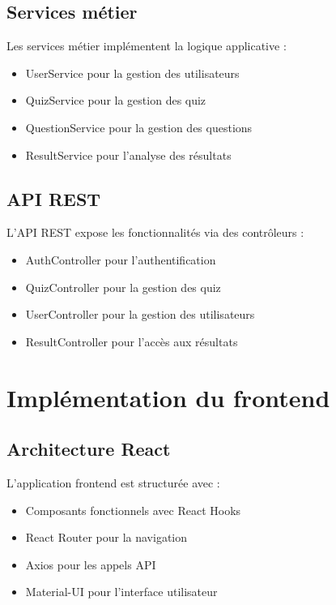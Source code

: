 \documentclass[12pt,a4paper]{report}
\begin{document}
\subsection{Services métier}

Les services métier implémentent la logique applicative :

\begin{itemize}
    \item UserService pour la gestion des utilisateurs
    \item QuizService pour la gestion des quiz
    \item QuestionService pour la gestion des questions
    \item ResultService pour l'analyse des résultats
\end{itemize}

\subsection{API REST}

L'API REST expose les fonctionnalités via des contrôleurs :

\begin{itemize}
    \item AuthController pour l'authentification
    \item QuizController pour la gestion des quiz
    \item UserController pour la gestion des utilisateurs
    \item ResultController pour l'accès aux résultats
\end{itemize}

\section{Implémentation du frontend}

\subsection{Architecture React}

L'application frontend est structurée avec :

\begin{itemize}
    \item Composants fonctionnels avec React Hooks
    \item React Router pour la navigation
    \item Axios pour les appels API
    \item Material-UI pour l'interface utilisateur
\end{itemize}
\end{document}
